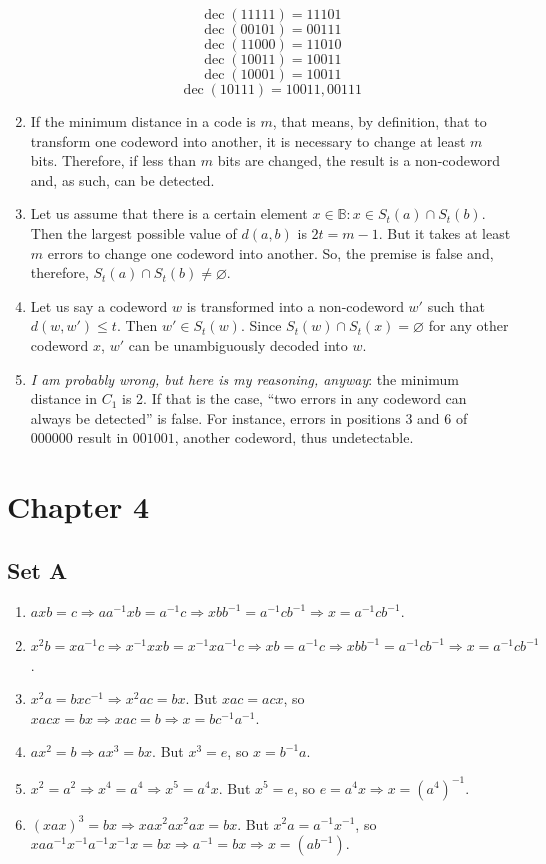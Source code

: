 \documentclass{article}
\let\emptyset\varnothing
\DeclareMathOperator{\dec}{dec}
\begin{document}
\begin{enumerate}
        $$\dec(11111) = 11101$$
        $$\dec(00101) = 00111$$
        $$\dec(11000) = 11010$$
        $$\dec(10011) = 10011$$
        $$\dec(10001) = 10011$$
        $$\dec(10111) = 10011, 00111$$
    \item If the minimum distance in a code is $m$, that means, by definition, that to transform one codeword into another, it is necessary to change at least $m$ bits.
        Therefore, if less than $m$ bits are changed, the result is a non-codeword and, as such, can be detected.
    \item Let us assume that there is a certain element $x \in \mathbb{B}: x \in S_t(a) \cap S_t(b)$.
        Then the largest possible value of $d(a, b)$ is $2t = m - 1$.
        But it takes at least $m$ errors to change one codeword into another. So, the premise is false and, therefore, $S_t(a) \cap S_t(b) \ne \emptyset$.
    \item Let us say a codeword $w$ is transformed into a non-codeword $w'$ such that $d(w, w') \leqslant t$. Then $w' \in S_t(w)$.
        Since $S_t(w) \cap S_t(x) = \emptyset$ for any other codeword $x$, $w'$ can be unambiguously decoded into $w$.
    \item \emph{I am probably wrong, but here is my reasoning, anyway}: the minimum distance in $C_1$ is 2. 
        If that is the case, ``two errors in any codeword can always be detected'' is false. 
        For instance, errors in positions 3 and 6 of $000000$ result in $001001$, another codeword, thus undetectable.
\end{enumerate}

\section{Chapter 4}
\subsection{Set A}
\begin{enumerate}
    \item $axb = c \Rightarrow aa^{-1}xb = a^{-1}c \Rightarrow xbb^{-1} = a^{-1}cb^{-1} \Rightarrow x = a^{-1}cb^{-1}$.
    \item $x^2b = xa^{-1}c \Rightarrow x^{-1}xxb = x^{-1}xa^{-1}c \Rightarrow xb = a^{-1}c \Rightarrow xbb^{-1} = a^{-1}cb^{-1} \Rightarrow x = a^{-1}cb^{-1}$.
    \item $x^2a = bxc^{-1} \Rightarrow x^2ac = bx$. But $xac = acx$, so $xacx = bx \Rightarrow xac = b \Rightarrow x = bc^{-1}a^{-1}$.
    \item $ax^2 = b \Rightarrow ax^3 = bx$. But $x^3 = e$, so $x = b^{-1}a$.
    \item $x^2 = a^2 \Rightarrow x^4 = a^4 \Rightarrow x^5 = a^4x$. But $x^5 = e$, so $e = a^4x \Rightarrow x = (a^4)^{-1}$.
    \item $(xax)^3 = bx \Rightarrow xax^2ax^2ax = bx$. But $x^2a = a^{-1}x^{-1}$, so $xaa^{-1}x^{-1}a^{-1}x^{-1}x = bx \Rightarrow a^{-1} = bx \Rightarrow x = (ab^{-1})$.
\end{enumerate}
\end{document}
